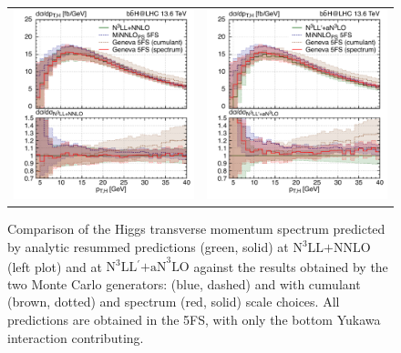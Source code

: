 \documentclass[11pt,a4paper]{article}
\begin{document}
\begin{figure}[t!]
\begin{center}
\begin{tabular}{cc}
\includegraphics[width=.45\textwidth, page=1]{plots/5fs/genevaminnlo/n3llnnloresvsMCs-withspectrum.pdf}&
\includegraphics[width=.45\textwidth, page=1]{plots/5fs/genevaminnlo/n3llan3loresvsMCs-withspectrum.pdf}
\end{tabular}
\vspace*{1ex}
\caption{Comparison of the Higgs transverse momentum spectrum predicted by analytic resummed predictions (green, solid) at $\text{N}^3\text{LL+NNLO}$ (left plot) and at $\text{N}^3\text{LL$^{\prime}$+aN}^3\text{LO}$ against the results obtained by the two Monte Carlo generators: \minnlo{} (blue, dashed) and \GENEVA{} with cumulant (brown, dotted) and spectrum (red, solid) scale choices. All predictions are obtained in the 5FS, with only the bottom Yukawa interaction contributing. \label{fig:resVSMCs}}
\end{center}
\end{figure}
\end{document}

